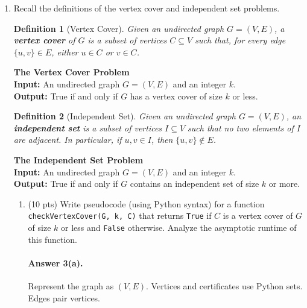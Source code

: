 \documentclass{article}
\newtheorem*{definition}{Definition}
\begin{document}
\begin{enumerate}
Single-character matches establish the induction base.
Assume shorter entries are correct.
Each split combines two correct shorter entries.
Every binary derivation splits this way.
Therefore, each computed cell contains exactly its generators.
Acceptance checks the complete string's cell.
Empty input uses the start variable's empty production.
Its table contains no cells.

Let $n$ denote the input length.
Let $p$ count grammar productions.
The expected running time is $O((p+1)(n^3+1))$.
This assumes constant-time hash operations.
Storage is $O(n^2|V|)$.


    \clearpage
    \item Recall the definitions of the vertex cover and independent set problems.
    \begin{definition}[Vertex Cover]
    Given an undirected graph $G=(V,E)$, a \textbf{vertex cover} of $G$ is a subset of vertices $C \subseteq V$ such that, for every edge $\{u,v\} \in E$, either $u \in C$ or $v \in C$.
    \end{definition}
    \noindent \textbf{The Vertex Cover Problem} \\
    \noindent \textbf{Input:} An undirected graph $G=(V,E)$ and an integer $k$. \\
    \noindent \textbf{Output:} True if and only if $G$ has a vertex cover of size $k$ or less.
    \begin{definition}[Independent Set]
    Given an undirected graph $G=(V,E)$, an \textbf{independent set} is a subset of vertices $I \subseteq V$ such that no two elements of $I$ are adjacent. In particular, if $u,v \in I$, then $\{u,v\} \not \in E$.
    \end{definition}
    \noindent \textbf{The Independent Set Problem} \\
    \noindent \textbf{Input:} An undirected graph $G=(V,E)$ and an integer $k$.\\
    \noindent \textbf{Output:} True if and only if $G$ contains an independent set of size $k$ or more.
    \begin{enumerate}
        \item (10 pts) Write pseudocode (using Python syntax) for a function \verb|checkVertexCover(G, k, C)| that returns \verb|True| if $C$ is a vertex cover of $G$ of size $k$ or less and \verb|False| otherwise. Analyze the asymptotic runtime of this function.


\paragraph{Answer 3(a).}\mbox{}\par
Represent the graph as $(V,E)$.
Vertices and certificates use Python sets.
Edges pair vertices.


\end{enumerate}
\end{enumerate}
\end{document}
